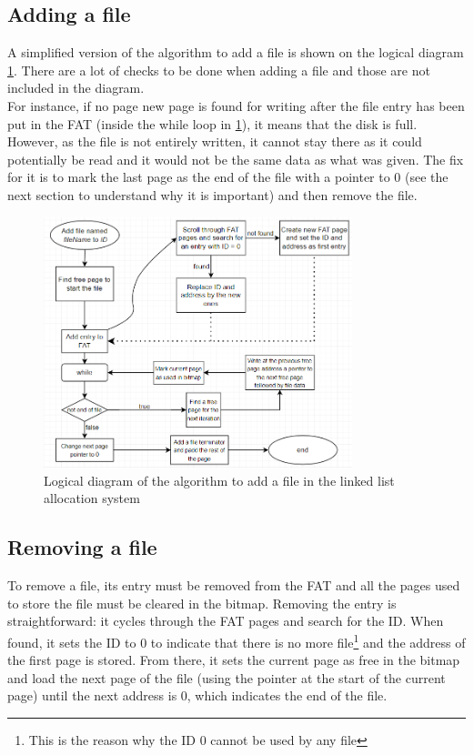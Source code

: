 \documentclass[10pt,a4paper]{ULBreport}
\begin{document}
\subsection{Adding a file}
A simplified version of the algorithm to add a file is shown on the logical diagram \ref{fig:Logic_add_LL}. There are a lot of checks to be done when adding a file and those are not included in the diagram. \\
For instance, if no page new page is found for writing after the file entry has been put in the FAT (inside the while loop in \ref{fig:Logic_add_LL}), it means that the disk is full. However, as the file is not entirely written, it cannot stay there as it could potentially be read and it would not be the same data as what was given. The fix for it is to mark the last page as the end of the file with a pointer to 0 (see the next section to understand why it is important) and then remove the file.
\begin{figure}
    \centering
    \includegraphics[width=0.8\textwidth]{Logic_add_LL.png}
    \caption{Logical diagram of the algorithm to add a file in the linked list allocation system}
    \label{fig:Logic_add_LL}
\end{figure}
\subsection{Removing a file}
To remove a file, its entry must be removed from the FAT and all the pages used to store the file must be cleared in the bitmap. Removing the entry is straightforward: it cycles through the FAT pages and search for the ID. When found, it sets the ID to 0 to indicate that there is no more file\footnote{This is the reason why the ID 0 cannot be used by any file} and the address of the first page is stored. From there, it sets the current page as free in the bitmap and load the next page of the file (using the pointer at the start of the current page) until the next address is 0, which indicates the end of the file.
\end{document}

